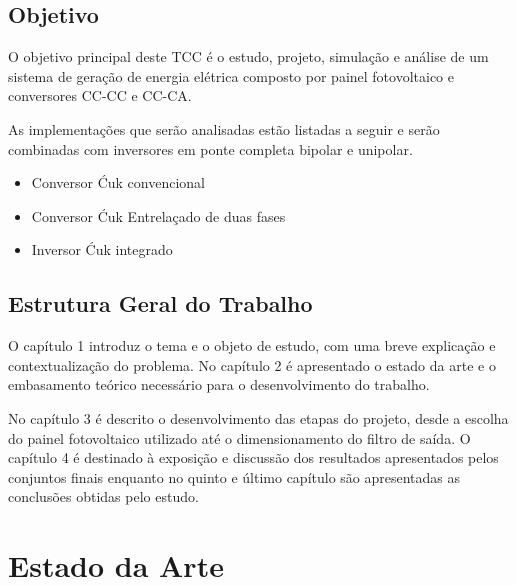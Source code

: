 \documentclass[
	12pt,				%
	openany,
	onseside,
	a4paper,			%
	english,			%
	french,				%
	spanish,			%
	brazil,				%
	]{abntex2}
\begin{document}
\section{Objetivo}

O objetivo principal deste TCC é o estudo, projeto, simulação e análise de um sistema de geração de energia elétrica composto por painel fotovoltaico e conversores CC-CC e CC-CA. 

As implementações que serão analisadas estão listadas a seguir e serão combinadas com inversores em ponte completa bipolar e unipolar.

\begin{itemize}
	
	\item Conversor Ćuk convencional
	\item Conversor Ćuk Entrelaçado de duas fases
	\item Inversor Ćuk integrado
	
\end{itemize}

\section{Estrutura Geral do Trabalho}

O capítulo 1 introduz o tema e o objeto de estudo, com uma breve explicação e contextualização do problema. No capítulo 2 é apresentado o estado da arte e o embasamento teórico necessário para o desenvolvimento do trabalho.

No capítulo 3 é descrito o desenvolvimento das etapas do projeto, desde a escolha do painel fotovoltaico utilizado até o dimensionamento do filtro de saída. O capítulo 4 é destinado à exposição e discussão dos resultados apresentados pelos conjuntos finais enquanto no quinto e último capítulo são apresentadas as conclusões obtidas pelo estudo.

\chapter{Estado da Arte}
\end{document}
